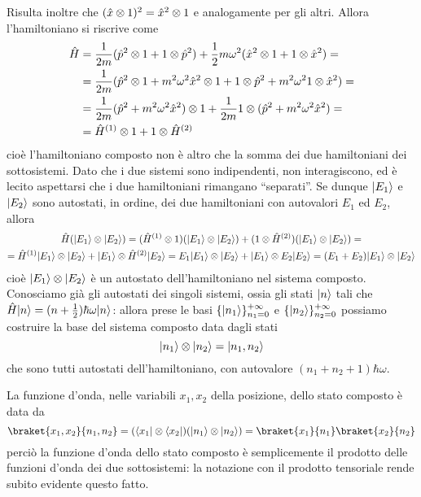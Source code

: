 Risulta inoltre che $(\hat{x}\otimes 1)^2=\hat{x}^2\otimes 1$ e analogamente per gli altri.
Allora l'hamiltoniano si riscrive come
\begin{equation}
	\begin{split}
		\hat{H}&=\frac1{2m}(\hat{p}^2\otimes 1+1\otimes\hat{p}^2)+\frac12m\omega^2(\hat{x}^2\otimes 1+1\otimes\hat{x}^2)=\\
		&=\frac1{2m}(\hat{p}^2\otimes 1+m^2\omega^2\hat{x}^2\otimes 1+1\otimes\hat{p}^2+m^2\omega^2 1\otimes\hat{x}^2)=\\
		&=\frac1{2m}(\hat{p}^2+m^2\omega^2\hat{x}^2)\otimes 1+\frac1{2m}1\otimes(\hat{p}^2+m^2\omega^2\hat{x}^2)=\\
		&=\hat{H}^{(1)}\otimes 1+1\otimes\hat{H}^{(2)}
	\end{split}
\end{equation}
cioè l'hamiltoniano composto non è altro che la somma dei due hamiltoniani dei sottosistemi.
Dato che i due sistemi sono indipendenti, non interagiscono, ed è lecito aspettarsi che i due hamiltoniani rimangano ``separati''.
Se dunque $\lvert E_1\rangle$ e $\lvert E_2\rangle$ sono autostati, in ordine, dei due hamiltoniani con autovalori $E_1$ ed $E_2$, allora
\begin{multline}
	\hat{H}(\lvert E_1\rangle\otimes\lvert E_2\rangle)=
	(\hat{H}^{(1)}\otimes 1)(\lvert E_1\rangle\otimes\lvert E_2\rangle)+(1\otimes\hat{H}^{(2)})(\lvert E_1\rangle\otimes\lvert E_2\rangle)=\\=
	\hat{H}^{(1)}\lvert E_1\rangle\otimes\lvert E_2\rangle+\lvert E_1\rangle\otimes\hat{H}^{(2)}\lvert E_2\rangle=E_1\lvert E_1\rangle\otimes\lvert E_2\rangle+\lvert E_1\rangle\otimes E_2\lvert E_2\rangle=(E_1+E_2)\lvert E_1\rangle\otimes\lvert E_2\rangle
\end{multline}
cioè $\lvert E_1\rangle\otimes\lvert E_2\rangle$ è un autostato dell'hamiltoniano nel sistema composto.
Conosciamo già gli autostati dei singoli sistemi, ossia gli stati $\lvert n\rangle$ tali che $\hat{H}\lvert n\rangle=(n+\frac12)\hbar\omega\lvert n\rangle$: allora prese le basi $\{\lvert n_1\rangle\}_{n_1=0}^{+\infty}$ e $\{\lvert n_2\rangle\}_{n_2=0}^{+\infty}$ possiamo costruire la base del sistema composto data dagli stati
\begin{equation}
	\lvert n_1\rangle\otimes\lvert n_2\rangle=\lvert n_1,n_2\rangle
\end{equation}
che sono tutti autostati dell'hamiltoniano, con autovalore $(n_1+n_2+1)\hbar\omega$.

La funzione d'onda, nelle variabili $x_1,x_2$ della posizione, dello stato composto è data da 
\begin{equation}
	\braket{x_1,x_2}{n_1,n_2}=(\bra{x_1}\otimes\bra{x_2})(\ket{n_1}\otimes\ket{n_2})=\braket{x_1}{n_1}\braket{x_2}{n_2}
\end{equation}
perciò la funzione d'onda dello stato composto è semplicemente il prodotto delle funzioni d'onda dei due sottosistemi: la notazione con il prodotto tensoriale rende subito evidente questo fatto.


